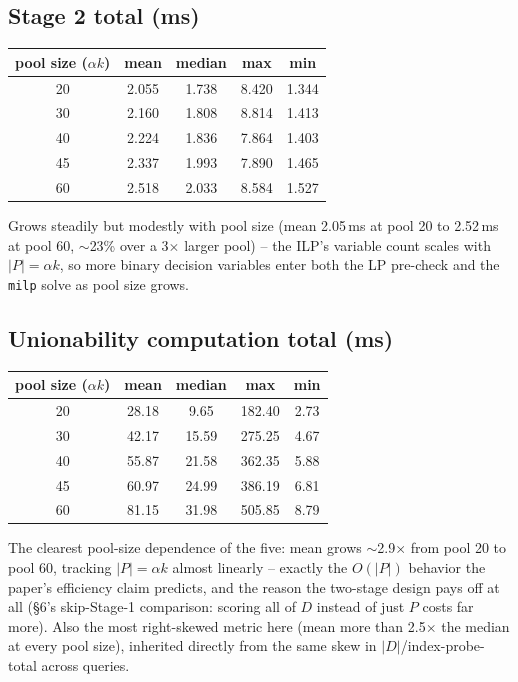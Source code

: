 \subsection{Stage 2 total (ms)}
\begin{center}
\begin{tabular}{ccccc}
\toprule
pool size ($\alpha k$) & mean & median & max & min \\
\midrule
20 & 2.055 & 1.738 & 8.420 & 1.344 \\
30 & 2.160 & 1.808 & 8.814 & 1.413 \\
40 & 2.224 & 1.836 & 7.864 & 1.403 \\
45 & 2.337 & 1.993 & 7.890 & 1.465 \\
60 & 2.518 & 2.033 & 8.584 & 1.527 \\
\bottomrule
\end{tabular}
\end{center}
Grows steadily but modestly with pool size (mean 2.05\,ms at pool 20 to 2.52\,ms
at pool 60, $\sim$23\% over a 3$\times$ larger pool) -- the ILP's variable count
scales with $|P|=\alpha k$, so more binary decision variables enter both the LP
pre-check and the \texttt{milp} solve as pool size grows.

\subsection{Unionability computation total (ms)}
\begin{center}
\begin{tabular}{ccccc}
\toprule
pool size ($\alpha k$) & mean & median & max & min \\
\midrule
20 & 28.18 & 9.65 & 182.40 & 2.73 \\
30 & 42.17 & 15.59 & 275.25 & 4.67 \\
40 & 55.87 & 21.58 & 362.35 & 5.88 \\
45 & 60.97 & 24.99 & 386.19 & 6.81 \\
60 & 81.15 & 31.98 & 505.85 & 8.79 \\
\bottomrule
\end{tabular}
\end{center}
The clearest pool-size dependence of the five: mean grows $\sim$2.9$\times$ from
pool 20 to pool 60, tracking $|P|=\alpha k$ almost linearly -- exactly the
$O(|P|)$ behavior the paper's efficiency claim predicts, and the reason the
two-stage design pays off at all (\S6's skip-Stage-1 comparison: scoring all of
$D$ instead of just $P$ costs far more). Also the most right-skewed metric here
(mean more than 2.5$\times$ the median at every pool size), inherited directly
from the same skew in $|D|$/index-probe-total across queries.

